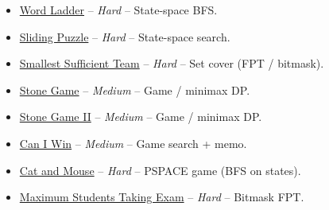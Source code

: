 \documentclass[11pt]{article}
\begin{document}
\begin{itemize}
  \item \href{https://leetcode.com/problems/word-ladder/}{Word Ladder} -- \emph{Hard} -- State-space BFS.
  \item \href{https://leetcode.com/problems/sliding-puzzle/}{Sliding Puzzle} -- \emph{Hard} -- State-space search.
  \item \href{https://leetcode.com/problems/smallest-sufficient-team/}{Smallest Sufficient Team} -- \emph{Hard} -- Set cover (FPT / bitmask).
  \item \href{https://leetcode.com/problems/stone-game/}{Stone Game} -- \emph{Medium} -- Game / minimax DP.
  \item \href{https://leetcode.com/problems/stone-game-ii/}{Stone Game II} -- \emph{Medium} -- Game / minimax DP.
  \item \href{https://leetcode.com/problems/can-i-win/}{Can I Win} -- \emph{Medium} -- Game search + memo.
  \item \href{https://leetcode.com/problems/cat-and-mouse/}{Cat and Mouse} -- \emph{Hard} -- PSPACE game (BFS on states).
  \item \href{https://leetcode.com/problems/maximum-students-taking-exam/}{Maximum Students Taking Exam} -- \emph{Hard} -- Bitmask FPT.
\end{itemize}
\end{document}
